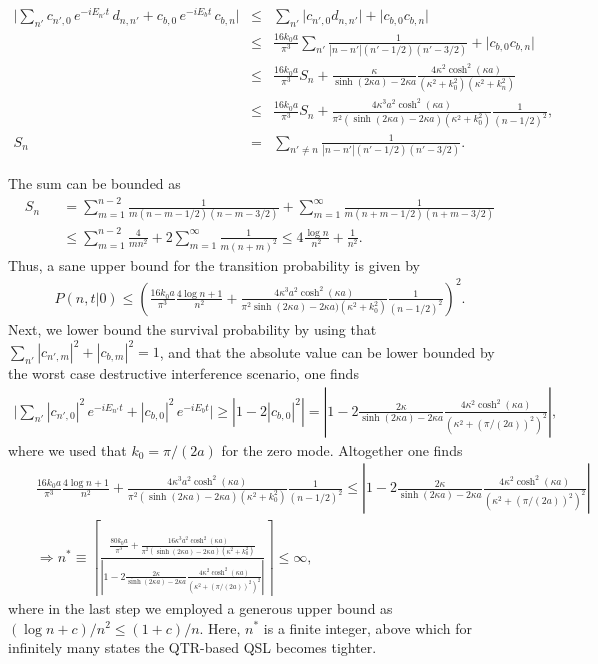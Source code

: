 \documentclass[prl,aps,amssymb,twocolumn,superscriptaddress, notitlepage, longbibliography]{revtex4-2}
\begin{document}
\begin{eqnarray}
    \Bigg|
\sum_{n'} c_{n',0} \, e^{-i E_{n'} t} \, d_{n,n'} + c_{b,0} \, e^{-i E_b t} \, c_{b,n}
\Bigg|&\leq&\sum_{n'}\lvert c_{n',0}d_{n,n'}\rvert+\lvert c_{b,0}c_{b,n}\rvert\\
&\leq&\frac{16k_0a}{\pi^3
}\sum_{n'}\frac{1}{|n-n'|(n'-1/2)(n'-3/2)}+\lvert c_{b,0}c_{b,n}\rvert \nonumber\\
&\leq&\frac{16k_0a}{\pi^3}S_n+\frac{\kappa}{\sinh(2\kappa a)-2\kappa a}\frac{4\kappa^2\cosh^2(\kappa a)}{(\kappa^2+k^2_0)(\kappa^2+k^2_n)}\nonumber\\
&\leq&\frac{16k_0a}{\pi^3}S_n+\frac{4\kappa^3 a^2\cosh^2(\kappa a)}{\pi^2(\sinh(2\kappa a)-2\kappa a)(\kappa^2+k^2_0)}\frac{1}{(n-1/2)^2},\\
S_n&=&\sum_{n'\neq n}\frac{1}{|n-n'|(n'-1/2)(n'-3/2)}.
\end{eqnarray}

The sum can be bounded as
\begin{eqnarray}
    S_n&&=\sum_{m=1}^{n-2}\frac{1}{m(n-m-1/2)(n-m-3/2)}+\sum_{m=1}^\infty\frac{1}{m(n+m-1/2)(n+m-3/2)}\\
    &&\leq \sum_{m=1}^{n-2}\frac{4}{mn^2}+2\sum_{m=1}^\infty\frac{1}{m(n+m)^2}\leq 4\frac{\log n}{n^2}+\frac{1}{n^2}.\nonumber
\end{eqnarray}
Thus, a sane upper bound for the transition probability is given by
\begin{eqnarray}
    P(n,t|0)\leq\left(\frac{16k_0a}{\pi^3}\frac{4\log n+1}{n^2}+\frac{4\kappa^3 a^2\cosh^2(\kappa a)}{\pi^2\sinh(2\kappa a)-2\kappa a)(\kappa^2+k^2_0)}\frac{1}{(n-1/2)^2}\right)^2.
\end{eqnarray}
Next, we lower bound the survival probability by using that $\sum_{n'}|c_{n',m}|^2+|c_{b,m}|^2=1$, and that the absolute value can be lower bounded by the worst case destructive interference scenario, one finds
\begin{eqnarray}
    \Bigg| \sum_{n'} |c_{n',0}|^2 \, e^{-i E_{n'} t} + |c_{b,0}|^2 \, e^{-i E_b t} \Bigg|\geq \left|1-2|c_{b,0}|^2\right|=\left\lvert1-2\frac{2\kappa}{\sinh(2\kappa a)-2\kappa a}\frac{4\kappa^2\cosh^2(\kappa a)}{(\kappa^2+(\pi/(2a))^2)^2}\right\rvert,
\end{eqnarray}
where we used that $k_0=\pi/(2a)$ for the zero mode.
Altogether one finds
\begin{eqnarray}
    &&\frac{16k_0a}{\pi^3}\frac{4\log n+1}{n^2}+\frac{4\kappa^3 a^2\cosh^2(\kappa a)}{\pi^2(\sinh(2\kappa a)-2\kappa a)(\kappa^2+k^2_0)}\frac{1}{(n-1/2)^2}\leq\left\lvert1-2\frac{2\kappa}{\sinh(2\kappa a)-2\kappa a}\frac{4\kappa^2\cosh^2(\kappa a)}{(\kappa^2+(\pi/(2a))^2)^2}\right\rvert\nonumber\\
    &&\Rightarrow n^*\equiv\left\lceil\frac{\frac{80k_0a}{\pi^3}+\frac{16\kappa^3a^2\cosh^2(\kappa a)}{\pi^2(\sinh(2\kappa a)-2\kappa a)(\kappa^2+k^2_0)}}{\left\lvert1-2\frac{2\kappa}{\sinh(2\kappa a)-2\kappa a}\frac{4\kappa^2\cosh^2(\kappa a)}{(\kappa^2+(\pi/(2a))^2)^2}\right\rvert}\right\rceil\leq \infty,
\end{eqnarray}
where in the last step we employed a generous upper bound as $(\log n+c)/n^2\leq (1+c)/n$. Here, $n^*$ is a finite integer, above which for infinitely many states the QTR-based QSL becomes tighter.
\end{document}
